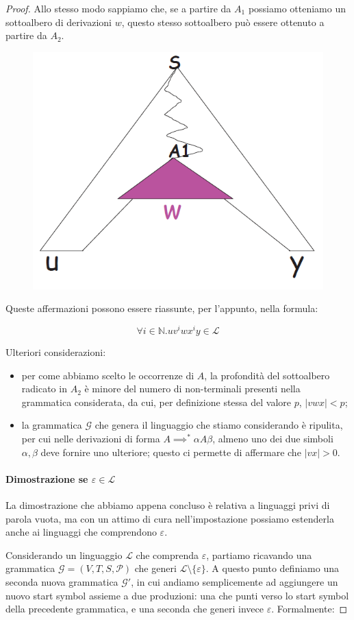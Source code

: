 \documentclass[class=book, crop=false, oneside, 12pt]{standalone}
\begin{document}
\begin{proof}
  Allo stesso modo sappiamo che, se a partire da \(A_1\) possiamo otteniamo un sottoalbero di derivazioni \(w\), questo stesso sottoalbero può essere ottenuto a partire da \(A_2\).

  \begin{figure}
    \centering
    \includegraphics[width=.25\textwidth,keepaspectratio]{pl-proof_5}
  \end{figure}

  Queste affermazioni possono essere riassunte, per l'appunto, nella formula:

  \begin{equation*}
    \forall i \in \mathbb{N}.uv^iwx^iy \in \mathcal{L}
  \end{equation*}

  Ulteriori considerazioni:
   \begin{itemize}
     \item per come abbiamo scelto le occorrenze di \(A\), la profondità del sottoalbero radicato in \(A_2\) è minore del numero di non-terminali presenti nella grammatica considerata, da cui, per definizione stessa del valore \(p\), \(|vwx| < p\);
     \item la grammatica \(\mathcal{G}\) che genera il linguaggio che stiamo considerando è ripulita, per cui nelle derivazioni di forma \(A \implies^* \alpha A \beta\), almeno uno dei due simboli \(\alpha, \beta\) deve fornire uno ulteriore; questo ci permette di affermare che \(|vx| > 0\).
   \end{itemize}

   \paragraph{Dimostrazione se \(\varepsilon \in \mathcal{L}\)}
   La dimostrazione che abbiamo appena concluso è relativa a linguaggi privi di parola vuota, ma con un attimo di cura nell'impostazione possiamo estenderla anche ai linguaggi che comprendono \(\varepsilon\).

   Considerando un linguaggio \(\mathcal{L}\) che comprenda \(\varepsilon\), partiamo ricavando una grammatica \(\mathcal{G} = (V, T, S, \mathcal{P})\) che generi \(\mathcal{L} \setminus \{\varepsilon\}\). A questo punto definiamo una seconda nuova grammatica \(\mathcal{G}'\), in cui andiamo semplicemente ad aggiungere un nuovo start symbol assieme a due produzioni: una che punti verso lo start symbol della precedente grammatica, e una seconda che generi invece \(\varepsilon\). Formalmente:


\end{proof}
\end{document}
